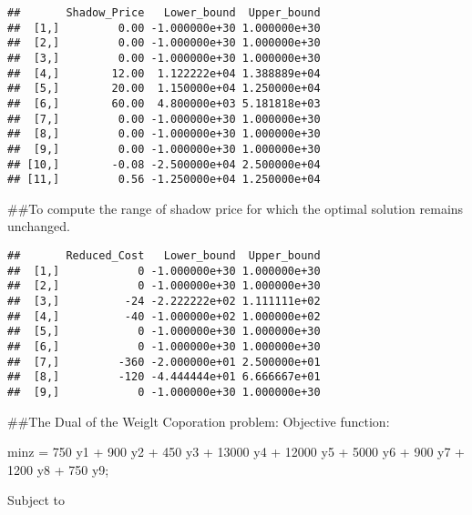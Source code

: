 \documentclass[
]{article}
\newenvironment{Shaded}{\begin{snugshade}}{\end{snugshade}}
\newcommand{\AttributeTok}[1]{\textcolor[rgb]{0.77,0.63,0.00}{#1}}
\newcommand{\DecValTok}[1]{\textcolor[rgb]{0.00,0.00,0.81}{#1}}
\newcommand{\FunctionTok}[1]{\textcolor[rgb]{0.00,0.00,0.00}{#1}}
\newcommand{\NormalTok}[1]{#1}
\newcommand{\SpecialCharTok}[1]{\textcolor[rgb]{0.00,0.00,0.00}{#1}}
\begin{document}
\begin{verbatim}
##       Shadow_Price   Lower_bound  Upper_bound
##  [1,]         0.00 -1.000000e+30 1.000000e+30
##  [2,]         0.00 -1.000000e+30 1.000000e+30
##  [3,]         0.00 -1.000000e+30 1.000000e+30
##  [4,]        12.00  1.122222e+04 1.388889e+04
##  [5,]        20.00  1.150000e+04 1.250000e+04
##  [6,]        60.00  4.800000e+03 5.181818e+03
##  [7,]         0.00 -1.000000e+30 1.000000e+30
##  [8,]         0.00 -1.000000e+30 1.000000e+30
##  [9,]         0.00 -1.000000e+30 1.000000e+30
## [10,]        -0.08 -2.500000e+04 2.500000e+04
## [11,]         0.56 -1.250000e+04 1.250000e+04
\end{verbatim}

\#\#To compute the range of shadow price for which the optimal solution
remains unchanged.

\begin{Shaded}
\end{Shaded}

\begin{verbatim}
##       Reduced_Cost   Lower_bound  Upper_bound
##  [1,]            0 -1.000000e+30 1.000000e+30
##  [2,]            0 -1.000000e+30 1.000000e+30
##  [3,]          -24 -2.222222e+02 1.111111e+02
##  [4,]          -40 -1.000000e+02 1.000000e+02
##  [5,]            0 -1.000000e+30 1.000000e+30
##  [6,]            0 -1.000000e+30 1.000000e+30
##  [7,]         -360 -2.000000e+01 2.500000e+01
##  [8,]         -120 -4.444444e+01 6.666667e+01
##  [9,]            0 -1.000000e+30 1.000000e+30
\end{verbatim}

\#\#The Dual of the Weiglt Coporation problem: Objective function:

minz = 750 y1 + 900 y2 + 450 y3 + 13000 y4 + 12000 y5 + 5000 y6 + 900 y7
+ 1200 y8 + 750 y9;

Subject to
\end{document}
